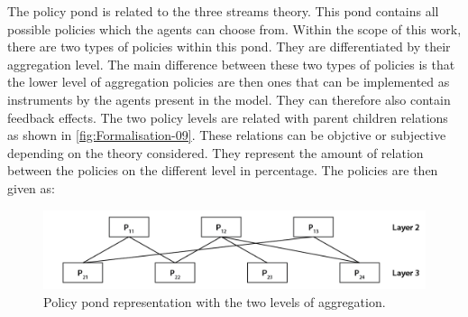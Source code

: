 The policy pond is related to the three streams theory. This pond contains all possible policies which the agents can choose from. Within the scope of this work, there are two types of policies within this pond. They are differentiated by their aggregation level. The main difference between these two types of policies is that the lower level of aggregation policies are then ones that can be implemented as instruments by the agents present in the model. They can therefore also contain feedback effects. The two policy levels are related with parent children relations as shown in \autoref{fig:Formalisation-09}. These relations can be objctive or subjective depending on the theory considered. They represent the amount of relation between the policies on the different level in percentage. The policies are then given as:

\begin{figure}
\centering
\includegraphics[scale = 0.75, angle = 0]{figures/Formalisation-09}
\caption{Policy pond representation with the two levels of aggregation.}
\label{fig:Formalisation-09}
\end{figure}

